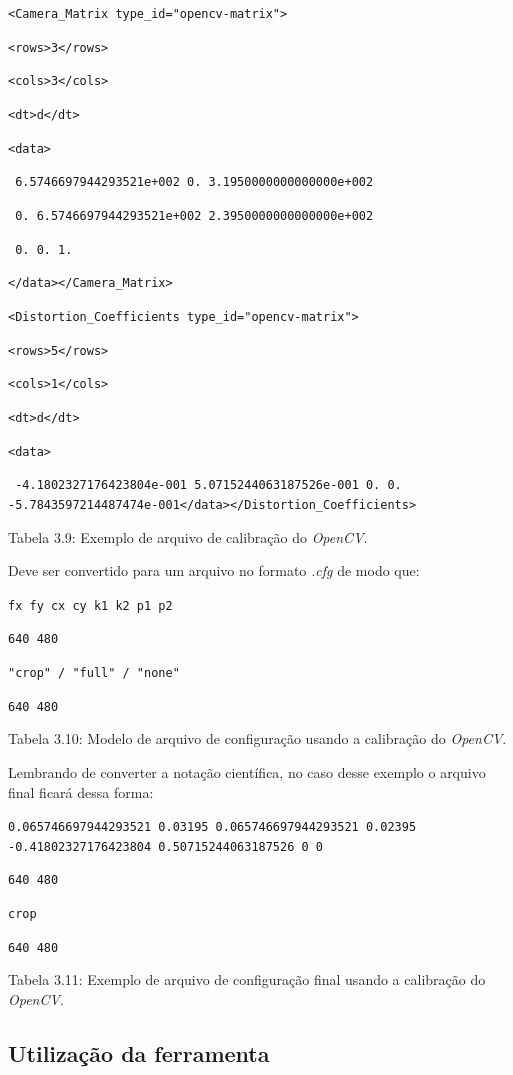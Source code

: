 {\setlength{\parindent}{0cm}
\texttt{<Camera\_Matrix type\_id="opencv-matrix">}

\texttt{<rows>3</rows>}

\texttt{<cols>3</cols>}

\texttt{<dt>d</dt>}

\texttt{<data>}

\texttt{ 6.5746697944293521e+002 0. 3.1950000000000000e+002}

\texttt{ 0. 6.5746697944293521e+002 2.3950000000000000e+002}

\texttt{ 0. 0. 1.}

\texttt{</data></Camera\_Matrix>}

\texttt{<Distortion\_Coefficients type\_id="opencv-matrix">}

\texttt{<rows>5</rows>}

\texttt{<cols>1</cols>}

\texttt{<dt>d</dt>}

\texttt{<data>}

\texttt{ -4.1802327176423804e-001 5.0715244063187526e-001 0. 0. -5.7843597214487474e-001</data></Distortion\_Coefficients>}}
 
Tabela 3.9: Exemplo de arquivo de calibração do \textit{OpenCV}.

Deve ser convertido para um arquivo no formato \textit{.cfg} de modo que:

{\setlength{\parindent}{0cm}\texttt{fx fy cx cy k1 k2 p1 p2}

\texttt{640 480}

\texttt{"crop" / "full" / "none"}

\texttt{640 480}}

Tabela 3.10: Modelo de arquivo de configuração usando a calibração do \textit{OpenCV}.

Lembrando de converter a notação científica, no caso desse exemplo o arquivo final ficará dessa forma:

{\setlength{\parindent}{0cm}
\texttt{0.065746697944293521 0.03195 0.065746697944293521 0.02395 -0.41802327176423804 0.50715244063187526 0 0}

\texttt{640 480}

\texttt{crop}

\texttt{640 480}}

Tabela 3.11: Exemplo de arquivo de configuração final usando a calibração do \textit{OpenCV}.

\subsection{Utilização da ferramenta}

